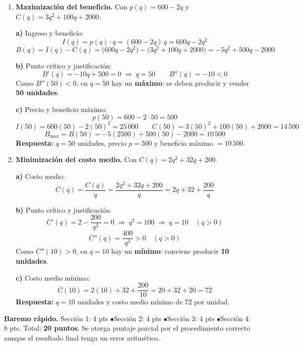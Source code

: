 \documentclass[12pt, letterpaper]{article}
\begin{document}
  \begin{enumerate}[leftmargin=*, label=\textbf{\arabic*.}]
    \item \textbf{Maximización del beneficio.} Con $p(q) = 600 - 2q$ y $C(q) = 3q^{2} + 100q + 2000$.

    \textbf{a)} Ingreso y beneficio:
    \[
      I(q) = p(q)\cdot q = (600 - 2q)\,q = 600q - 2q^{2}
    \]
    \[
      B(q) = I(q) - C(q)
           = \big(600q - 2q^{2}\big) - \big(3q^{2} + 100q + 2000\big)
           = -5q^{2} + 500q - 2000
    \]

    \textbf{b)} Punto crítico y justificación:
    \[
      B'(q) = -10q + 500 = 0 \;\Longrightarrow\; q = 50
      \qquad
      B''(q) = -10 < 0
    \]
    Como $B''(50) < 0$, en $q = 50$ hay un \textbf{máximo}: se deben producir y vender \textbf{50 unidades}.

    \textbf{c)} Precio y beneficio máximo:
    \[
      p(50) = 600 - 2\cdot 50 = 500
    \]
    \[
      I(50) = 600(50) - 2(50)^{2} = 25\,000
      \qquad
      C(50) = 3(50)^{2} + 100(50) + 2000 = 14\,500
    \]
    \[
      B_{\max} = B(50) = -5(2500) + 500(50) - 2000 = 10\,500
    \]
    \textbf{Respuesta:} $q = 50$ unidades, precio $p = 500$ y beneficio máximo $= 10\,500$.

    \item \textbf{Minimización del costo medio.} Con $C(q) = 2q^{2} + 32q + 200$.

    \textbf{a)} Costo medio:
    \[
      \overline{C}(q) = \frac{C(q)}{q} = \frac{2q^{2} + 32q + 200}{q} = 2q + 32 + \frac{200}{q}
    \]

    \textbf{b)} Punto crítico y justificación:
    \[
      \overline{C}'(q) = 2 - \frac{200}{q^{2}} = 0
      \;\Longrightarrow\; q^{2} = 100
      \;\Longrightarrow\; q = 10 \quad (q > 0)
    \]
    \[
      \overline{C}''(q) = \frac{400}{q^{3}} > 0 \quad (q > 0)
    \]
    Como $\overline{C}''(10) > 0$, en $q = 10$ hay un \textbf{mínimo}: conviene producir \textbf{10 unidades}.

    \textbf{c)} Costo medio mínimo:
    \[
      \overline{C}(10) = 2(10) + 32 + \frac{200}{10} = 20 + 32 + 20 = 72
    \]
    \textbf{Respuesta:} $q = 10$ unidades y costo medio mínimo de $72$ por unidad.

  \end{enumerate}

  \vspace{10pt}
  \begin{cuadrosolucion}
    \textbf{Baremo rápido.} Sección 1: 4 pts \quad$\bullet$\quad Sección 2: 4 pts \quad$\bullet$\quad Sección 3: 4 pts \quad$\bullet$\quad Sección 4: 8 pts. Total: \textbf{20 puntos}. Se otorga puntaje parcial por el procedimiento correcto aunque el resultado final tenga un error aritmético.
  \end{cuadrosolucion}
\fi
\end{document}
